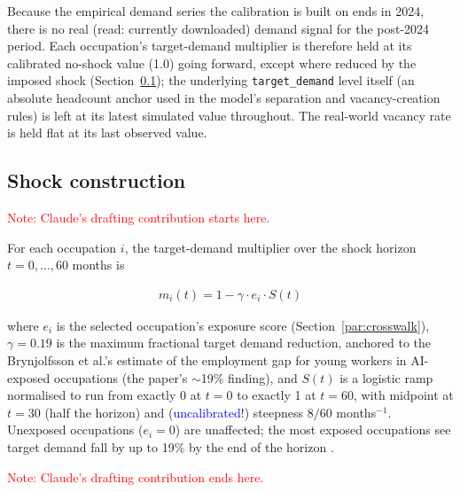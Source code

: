 \documentclass{article}
\begin{document}
Because the empirical demand series the calibration is built on ends in 2024, there is no real (read: currently downloaded) demand signal for the post-2024 period. Each occupation's target-demand multiplier is
therefore held at its calibrated no-shock value (1.0) going forward, except where reduced by the
imposed shock (Section~\ref{sec:shock}); the underlying \texttt{target\_demand} level itself (an
absolute headcount anchor used in the model's separation and vacancy-creation rules) is left at its
latest simulated value throughout. The real-world vacancy rate is held flat at its last observed value.

\subsection{Shock construction}
\label{sec:shock}

\textcolor{red}{Note: Claude's drafting contribution starts here.}

For each occupation $i$, the target-demand multiplier over the shock horizon $t = 0, \dots, 60$
months is

\begin{align}
  m_i(t) = 1 - \gamma \cdot e_i \cdot S(t)
\end{align}

where $e_i$ is the selected occupation's exposure score (Section~\ref{par:crosswalk}), $\gamma = 0.19$ is
the maximum fractional target demand reduction, anchored to the Brynjolfsson et al.'s estimate of the employment gap for young workers in AI-exposed occupations (the
paper's $\sim$19\% finding), and $S(t)$ is a logistic ramp normalised to run from exactly 0 at $t=0$
to exactly 1 at $t=60$, with midpoint at $t=30$ (half the horizon) and (\textcolor{blue}{uncalibrated!}) steepness $8/60$ months$^{-1}$.
Unexposed occupations ($e_i = 0$) are unaffected; the most exposed occupations see target demand fall
by up to 19\% by the end of the horizon \parencite{brynjolfsson_canaries_2025}.

\textcolor{red}{Note: Claude's drafting contribution ends here.}
\end{document}
